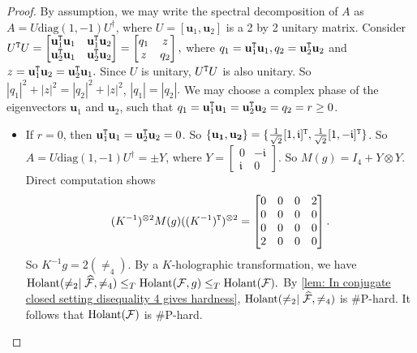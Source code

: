 \begin{proof}
    By assumption, we may write the spectral decomposition of $A$ as $A=U\mathrm{diag}(1,-1)U^\dagger$, where $U=[\mathbf{u}_1, \mathbf{u}_2]$ is a 2 by 2 unitary matrix.
    Consider $U^{\tt T}U=\left[\begin{matrix}
        \mathbf{u}_1^{\tt T}\mathbf{u}_1 & \mathbf{u}_1^{\tt T}\mathbf{u}_2\\
        \mathbf{u}_2^{\tt T}\mathbf{u}_1 & \mathbf{u}_2^{\tt T}\mathbf{u}_2
    \end{matrix}\right]=\left[\begin{matrix}
        q_1 & z\\
        z & q_2
    \end{matrix}\right],$
    where $q_1=\mathbf{u}_1^{\tt T}\mathbf{u}_1,q_2=\mathbf{u}_2^{\tt T}\mathbf{u}_2$ and $z=\mathbf{u}_1^{\tt T}\mathbf{u}_2=\mathbf{u}_2^{\tt T}\mathbf{u}_1.$
    Since $U$ is unitary, $U^{\tt T}U$ is also unitary.
    So $|q_1|^2+|z|^2=|q_2|^2+|z|^2$, $|q_1|=|q_2|.$
    We may choose a complex phase of the eigenvectors $\mathbf{u}_1$ and $\mathbf{u}_2$, such that $q_1=\mathbf{u}_1^{\tt T}\mathbf{u}_1=\mathbf{u}_2^{\tt T}\mathbf{u}_2=q_2=r\ge 0$.
    \begin{itemize}
        \item If $r=0$, then $\mathbf{u}_1^{\tt T}\mathbf{u}_1=\mathbf{u}_2^{\tt T}\mathbf{u}_2=0$.
        So $\{\mathbf{u_1},\mathbf{u_2}\}=\{\frac{1}{\sqrt{2}}[1, \mathfrak{i}]^{\tt T},\frac{1}{\sqrt{2}}[1,-\mathfrak{i}]^{\tt T}\}$.
        So $A=U\mathrm{diag}(1,-1)U^\dagger=\pm Y$, where $Y=\left[\begin{matrix}
            0 & -\mathfrak{i}\\
            \mathfrak{i} & 0
        \end{matrix}\right]$.
        So $M(g)=I_4+Y\otimes Y.$
        Direct computation shows
        \[
        (K^{-1})^{\otimes 2}M(g)((K^{-1})^{\tt T})^{\otimes 2}=\begin{bmatrix}
            0& 0 & 0 & 2\\
            0& 0 & 0 & 0\\
            0& 0 & 0 & 0\\
            2& 0 & 0 & 0\\
        \end{bmatrix}.
        \]
        So $K^{-1}g=2(\neq_4).$
        By a $K$-holographic transformation, we have $\operatorname{Holant}(\neq_2\mid \widehat{\mathcal{F}},\neq_4)\le_T \operatorname{Holant}(\mathcal{F},g)\le_T\operatorname{Holant}(\mathcal{F}).$
        By \cref{lem: In conjugate closed setting disequality 4 gives hardness}, $\operatorname{Holant}(\neq_2\mid \widehat{\mathcal{F}},\neq_4)$ is \#P-hard.
        It follows that $\operatorname{Holant}(\mathcal{F})$ is \#P-hard.
        

\end{itemize}
\end{proof}
